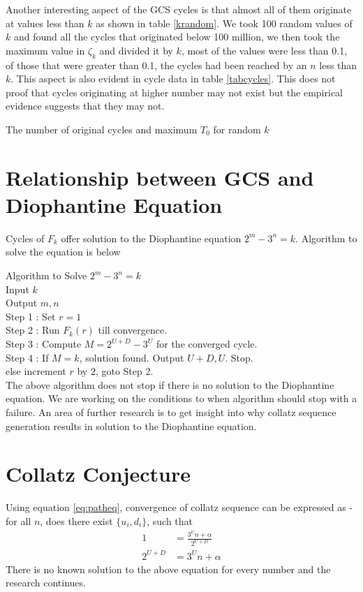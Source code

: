 \documentclass[12pt]{article} %
\begin{document}
Another interesting aspect of the GCS cycles is that almost all of them originate at values less than $k$ as shown in table \ref{krandom}. We took 100 random values of $k$ and found all the cycles that originated below 100 million, we then took the maximum value in $\zeta_k$ and divided it by $k$, most of the values were less than 0.1, of those that were greater than 0.1, the cycles had been reached by an $n$ less than $k$. This aspect is also evident in cycle data in table \ref{tabcycles}. This does not proof that cycles originating at higher number may not exist but the empirical evidence suggests that they may not.

\noindent
\begin{table}[H]
\tiny
{}
\caption{The number of original cycles and maximum $T_0$ for random $k$}
\label{krandom}
\end{table}

\section{Relationship between GCS and Diophantine Equation}
Cycles of $F_k$ offer solution to the Diophantine equation $2^m - 3^n = k$. Algorithm to solve the equation is below

Algorithm to Solve $2^m - 3^n = k$\\
Input $k$\\
Output $m, n$\\
Step 1 : Set $r = 1$\\
Step 2 : Run $F_k(r)$ till convergence.\\
Step 3 : Compute $M = 2^{U+D} - 3^U$ for the converged cycle.\\
Step 4 : If $M = k$, solution found. Output $U+D, U$. Stop.\\
         else increment $r$ by $2$, goto Step 2.\\

The above algorithm does not stop if there is no solution to the Diophantine equation. We are working on the conditions to when algorithm should stop with a failure. An area of further research is to get insight into why collatz sequence generation results in solution to the Diophantine equation. 

\section{Collatz Conjecture}

Using equation \eqref{eq:patheq}, convergence of collatz sequence can be expressed as - for all $n$, does there exist $\{u_i, d_i\}$, such that
\begin{align*}
1 & = \frac{3^U n + \alpha}{2^{U+D}}\\
2^{U+D} & = 3^U n + \alpha
\end{align*}
There is no known solution to the above equation for every number and the research continues. 
\end{document}

